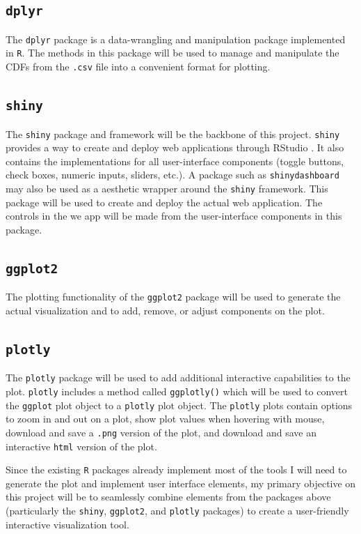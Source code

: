 \documentclass[11pt]{asaproc}\usepackage[]{graphicx}\usepackage[]{color}
\begin{document}
\subsection{{\tt dplyr}}
The {\tt dplyr} package \citep{DPLYR} is a data-wrangling and manipulation package implemented in {\tt R}. The methods in this package will be used to manage and manipulate the CDFs from the {\tt .csv} file into a convenient format for plotting. 

\subsection{{\tt shiny}}
The {\tt shiny} package and framework \citep{SHINY} will be the backbone of this project. {\tt shiny} provides a way to create and deploy web applications through RStudio \citep{RSTUDIO}. It also contains the implementations for all user-interface components (toggle buttons, check boxes, numeric inputs, sliders, etc.). A package such as {\tt shinydashboard} \citep{DASH} may also be used as a aesthetic wrapper around the {\tt shiny} framework. This package will be used to create and deploy the actual web application. The controls in the we app will be made from the user-interface components in this package. 

\subsection{{\tt ggplot2}}
The plotting functionality of the {\tt ggplot2} package \citep{GGPLOT} will be used to generate the actual visualization and to add, remove, or adjust components on the plot. 

\subsection{{\tt plotly}}
The {\tt plotly} package \citep{PLOTLY} will be used to add additional interactive capabilities to the plot. {\tt plotly} includes a method called {\tt ggplotly()} which will be used to convert the {\tt ggplot} plot object to a {\tt plotly} plot object. The {\tt plotly} plots contain options to zoom in and out on a plot, show plot values when hovering with mouse, download and save a {\tt .png} version of the plot, and download and save an interactive {\tt html} version of the plot. 

\vspace{5mm}

Since the existing {\tt R} packages already implement most of the tools I will need to generate the plot and implement user interface elements, my primary objective on this project will be to seamlessly combine elements from the packages above (particularly the {\tt shiny}, {\tt ggplot2}, and {\tt plotly} packages) to create a user-friendly interactive visualization tool. 




\end{document}

